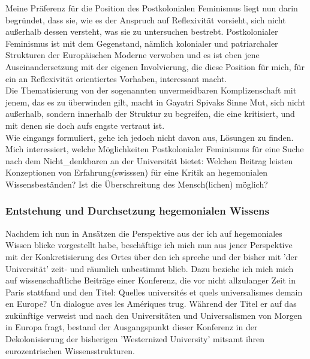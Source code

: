 \noindent Meine Präferenz für die Position des Postkolonialen Feminismus liegt nun darin
begründet, dass sie, wie es der Anspruch auf Reflexivität vorsieht, sich nicht
außerhalb dessen versteht, was sie zu untersuchen bestrebt. Postkolonialer
Feminismus ist mit dem Gegenstand, nämlich kolonialer und patriarchaler
Strukturen der Europäischen Moderne verwoben und es ist eben jene
Auseinandersetzung mit der eigenen Involvierung, die diese Position für mich,
für ein an Reflexivität orientiertes Vorhaben, interessant macht. \\
Die
Thematisierung von der sogenannten unvermeidbaren Komplizenschaft mit jenem,
das es zu überwinden gilt, macht in Gayatri Spivaks Sinne Mut, sich nicht
außerhalb, sondern innerhalb der Struktur zu begreifen, die eine kritisiert,
und mit denen sie doch \glqq aufs engste vertraut ist.\grqq \footnotemark 
{}\\

\noindent Wie eingangs formuliert, gehe ich jedoch nicht davon aus, Lösungen zu finden.
Mich interessiert, welche Möglichkeiten Postkolonialer Feminismus für eine
Suche nach dem Nicht\_denkbaren an der Universität bietet: Welchen Beitrag
leisten Konzeptionen von Erfahrung(swisssen) für eine Kritik an hegemonialen
Wissensbeständen? Ist die Überschreitung des Mensch(lichen) möglich?

\subsubsection{Entstehung und Durchsetzung hegemonialen Wissens}

Nachdem ich nun in Ansätzen die Perspektive aus der ich auf hegemoniales Wissen
blicke vorgestellt habe, beschäftige ich mich nun aus jener Perspektive mit der
Konkretisierung des Ortes über den ich spreche und der bisher mit 'der
Universität' zeit- und räumlich unbestimmt blieb. Dazu beziehe ich mich mich
auf wissenschaftliche Beiträge einer Konferenz, die vor nicht allzulanger Zeit
in Paris stattfand und den Titel: \glqq Quelles universités et quels
universalismes demain en Europe? Un dialogue aves les Amériques\grqq
\footnotemark {} trug. Während der Titel er auf das zukünftige
verweist und nach den Universitäten und Universalismen von Morgen in Europa
fragt, bestand der Ausgangspunkt dieser Konferenz in der Dekolonisierung der
bisherigen 'Westernized University' mitsamt ihren eurozentrischen
Wissensstrukturen.\\ 

